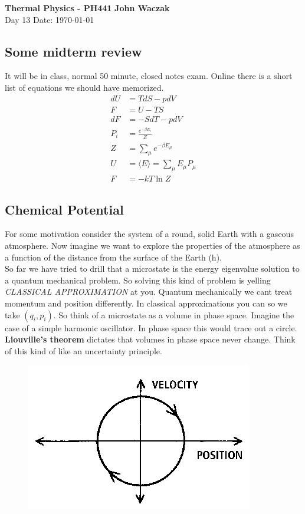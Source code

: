 \documentclass[a4paper, 11pt]{article}
\begin{document}
\noindent
\large\textbf{Thermal Physics - PH441} \hfill \textbf{John Waczak} \\
\normalsize Day 13 \hfill  Date: \today \\

	
		
\subsection*{Some midterm review} 
	It will be in class, normal 50 minute, closed notes exam. Online there is a short list of equations we should have memorized. 
		\begin{align*}
			dU &= TdS - pdV \\ 
			F &= U - TS \\ 
			dF &= -SdT - pdV \\ 
			P_i &= \frac{e^{-\beta E_i}}{Z} \\ 
			Z &= \sum\limits_\mu e^{-\beta E_\mu} \\ 
			U &= \langle E \rangle = \sum\limits_\mu E_\mu P_\mu \\ 
			F &= -kT\ln Z
		\end{align*}
		
		
\subsection*{Chemical Potential}
	For some motivation consider the system of a round, solid Earth with a gaseous atmosphere. Now imagine we want to explore the properties of the atmosphere as a function of the distance from the surface of the Earth (h). \\
	
	\noindent So far we have tried to drill that a microstate is the energy eigenvalue solution to a quantum mechanical problem. So solving this kind of problem is yelling \textit{CLASSICAL APPROXIMATION} at you. Quantum mechanically we cant treat momentum and position differently. In classical approximations you can so we take $(q_i, p_i)$. So think of a microstate as a volume in phase space. Imagine the case of a simple harmonic oscillator. In phase space this would 
	trace out a circle. \textbf{Liouville's theorem} dictates that volumes in phase space never change. Think of this kind of like an uncertainty principle. 
		\begin{figure}[!hbt]
			\centering
			\includegraphics[width=0.4\columnwidth]{sho_phaseSpace}
		\end{figure}
		
\end{document}
